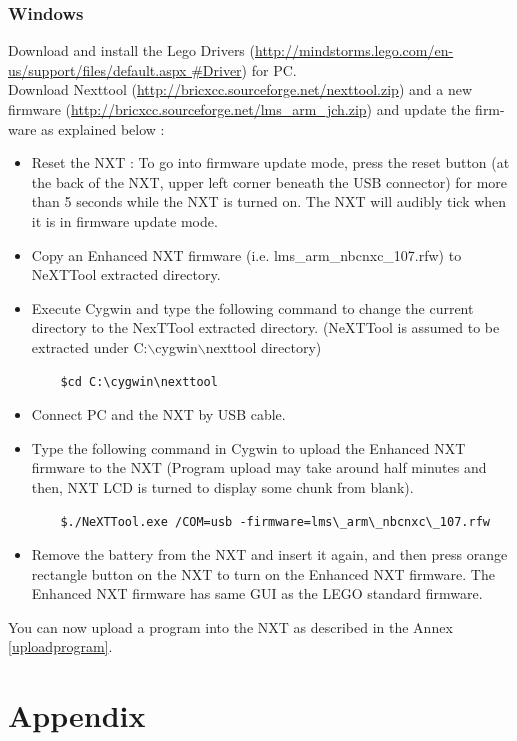 \subsection{Windows}
Download and install the Lego Drivers (\href{http://mindstorms.lego.com/en-us/support/files/default.aspx#Driver}{http://mindstorms.lego.com/en-us/support/files/default.aspx
\#Driver}) for PC. \\
Download Nexttool (\href{http://bricxcc.sourceforge.net/nexttool.zip}{http://bricxcc.sourceforge.net/nexttool.zip}) and a new firmware (\href{http://bricxcc.sourceforge.net/lms_arm_jch.zip}{http://bricxcc.sourceforge.net/lms\_arm\_jch.zip}) and update the firm-ware as explained below :
\begin{itemize}
\item Reset the NXT : To go into firmware update mode, press the reset button (at the back of the NXT, upper left corner beneath the USB connector) for more than 5 seconds while the NXT is turned on. The NXT will audibly tick when it is in firmware update mode.
\item Copy an Enhanced NXT firmware (i.e. lms\_arm\_nbcnxc\_107.rfw) to NeXTTool extracted directory.
\item Execute Cygwin and type the following command to change the current directory to the NexTTool extracted directory. (NeXTTool is assumed to be extracted under C:$\backslash$cygwin$\backslash$nexttool directory)
	\begin{verbatim}
	$cd C:\cygwin\nexttool
	\end{verbatim}
\item Connect PC and the NXT by USB cable.
\item Type the following command in Cygwin to upload the Enhanced NXT firmware to the NXT (Program upload may take around half minutes and then, NXT LCD is turned to display some chunk from blank).
	\begin{verbatim}
	$./NeXTTool.exe /COM=usb -firmware=lms\_arm\_nbcnxc\_107.rfw
	\end{verbatim}
\item Remove the battery from the NXT and insert it again, and then press orange rectangle button on the NXT to turn on the Enhanced NXT firmware. The Enhanced NXT firmware has same GUI as the LEGO standard firmware.
\end{itemize}
You can now upload a program into the NXT as described in the Annex \ref{uploadprogram}.

\newpage
\chapter{Appendix}
